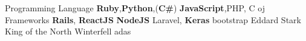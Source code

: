%
%
%


\begin{referees}
		{Programming Language}
		{\textbf{Ruby},\textbf{Python},(\textbf{C\#})}
		{\textbf{JavaScript},PHP, C}
		{oj}
		{Frameworks}
		{\textbf{Rails}, {\textbf{ReactJS}} \textbf{NodeJS}}
		{Laravel, \textbf{Keras}}
		{bootstrap}
		{Eddard Stark}
		{King of the North}
		{Winterfell}
		{adas}
\end{referees}